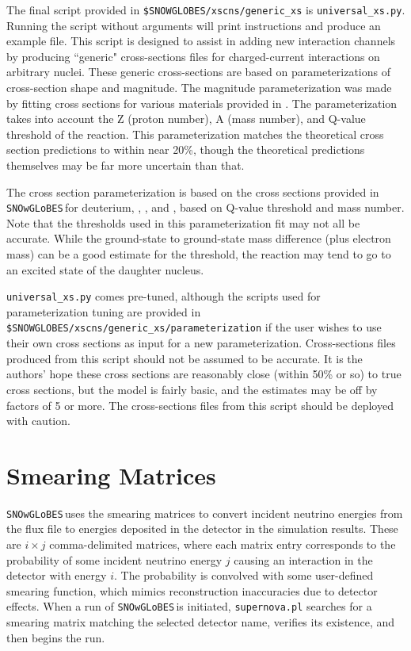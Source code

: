 \documentclass{article}
\newcommand{\snow}{\texttt{SNOwGLoBES}\,}
\begin{document}
The final script provided in \texttt{\$SNOWGLOBES/xscns/generic\_xs} is \texttt{universal\_xs.py}. Running the script without arguments will print instructions and produce an example file. This script is designed to assist in adding new interaction channels by producing ``generic" cross-sections files for charged-current interactions on arbitrary nuclei. These generic cross-sections are based on parameterizations of cross-section shape and magnitude. The magnitude parameterization was made by fitting cross sections for various materials provided in \cite{SajjadAthar:2005ke}. The parameterization takes into account the Z (proton number), A (mass number), and Q-value threshold of the reaction.  This parameterization matches the theoretical cross section predictions to within near 20\%, though the theoretical predictions themselves may be far more uncertain than that.

The cross section parameterization is based on the cross sections provided in \snow for deuterium, , , and , based on Q-value threshold and mass number. Note that the thresholds used in this parameterization fit may not all be accurate.
While the ground-state to ground-state mass difference (plus electron mass) can be a good estimate for the threshold, the reaction may tend to go to an excited state of the daughter nucleus.

\texttt{universal\_xs.py} comes pre-tuned, although the scripts used for parameterization tuning are provided in \texttt{\$SNOWGLOBES/xscns/generic\_xs/parameterization} if the user wishes to use their own cross sections as input for a new parameterization.  Cross-sections files produced from this script should not be assumed to be accurate.  It is the authors' hope these cross sections are reasonably close (within 50\% or so) to true cross sections, but the model is fairly basic, and the estimates may be off by factors of 5 or more. The cross-sections files from this script should be deployed with caution.

\section{Smearing Matrices} \label{sec:smearmatrix}

\snow uses the smearing matrices to convert incident neutrino energies from the flux file to energies deposited in the detector in the simulation results. These are $i \times j$ comma-delimited matrices, where each matrix entry corresponds to the probability of some incident neutrino energy $j$ causing an interaction in the detector with energy $i$. The probability is convolved with some user-defined smearing function, which mimics reconstruction inaccuracies due to detector effects. When a run of \snow is initiated, \texttt{supernova.pl} searches for a smearing matrix matching the selected detector name, verifies its existence, and then begins the run.
\end{document}
